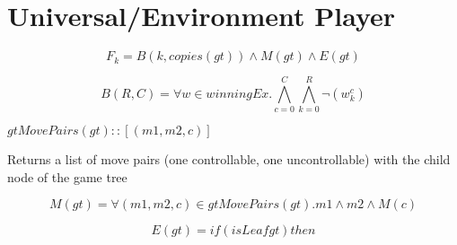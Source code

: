 \documentclass[a4paper,10pt]{article}
\begin{document}
\section{Universal/Environment Player}
$$
F_k = B(k, copies(gt)) \land M(gt) \land E(gt)
$$

$$
B(R, C) = \forall w \in winningEx . \bigwedge\limits_{c = 0}^C \bigwedge\limits_{k = 0}^R \lnot(w_k^c)
$$

$ gtMovePairs(gt) :: [(m1, m2, c)] $

Returns a list of move pairs (one controllable, one uncontrollable) with the child node of the game tree

$$
M(gt) = \forall (m1, m2, c) \in gtMovePairs(gt) . m1 \land m2 \land M(c)
$$

$$
E(gt) = if (isLeaf gt) then 
$$
\end{document}
